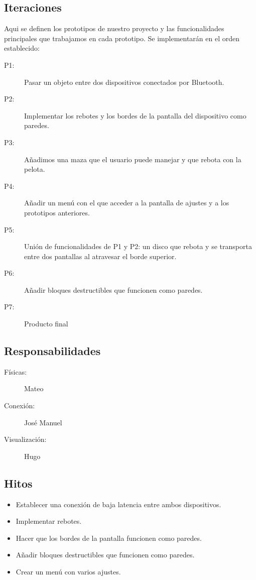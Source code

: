 \documentclass[a4paper,openright,12pt]{article}
\begin{document}
\subsection{Iteraciones}
Aqui se definen los prototipos de nuestro proyecto y las funcionalidades principales que trabajamos en cada prototipo. Se implementarán en el orden establecido:
\begin{description}
\item[P1:] Pasar un objeto entre dos dispositivos conectados por Bluetooth.
\item[P2:] Implementar los rebotes y los bordes de la pantalla del dispositivo como paredes.
\item[P3:] Añadimos una maza que el usuario puede manejar y que rebota con la pelota.
\item[P4:] Añadir un menú con el que acceder a la pantalla de ajustes y a los prototipos anteriores.
\item[P5:] Unión de funcionalidades de P1 y P2: un disco que rebota y se transporta entre dos pantallas al atravesar el borde superior.
\item[P6:] Añadir bloques destructibles que funcionen como paredes.
\item[P7:] Producto final
\end{description}
\subsection{Responsabilidades}
\begin{description}

\item[Físicas:] Mateo 
\item[Conexión:] José Manuel
\item[Visualización:] Hugo
\end{description}

\subsection{Hitos}
\begin{itemize}
\item Establecer una conexión de baja latencia entre ambos dispositivos.
\item Implementar rebotes.
\item Hacer que los bordes de la pantalla funcionen como paredes.
\item Añadir bloques destructibles que funcionen como paredes.
\item Crear un menú con varios ajustes.
\end{itemize}
\end{document}
